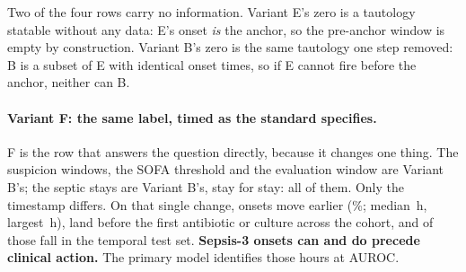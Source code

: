 \begin{table}[H]
    \centering\small
    \caption{Events in the treatment-anchored (pre-treatment) evaluation window.
    E's and B's zeros are entailed by Proposition~\ref{prop:h3}. Variant F holds
    the Sepsis-3 conjunction and the labelled stays fixed and changes only the
    onset timestamp to the standard $\min(t_{\text{susp}}, t_{\text{SOFA}})$;
    Variant D removes the infection anchor altogether.}
    \label{tab:pretreatment_label}
\end{table}

Two of the four rows carry no information. Variant E's zero is a tautology
statable without any data: E's onset \emph{is} the anchor, so the pre-anchor
window is empty by construction. Variant B's zero is the same tautology one step
removed: B is a subset of E with identical onset times, so if E cannot fire
before the anchor, neither can B.

\paragraph{Variant F: the same label, timed as the standard specifies.}
F is the row that answers the question directly, because it changes one thing.
The suspicion windows, the SOFA threshold and the evaluation window are Variant
B's; the septic stays are Variant B's, stay for stay: all \pcFNOnsets{} of
them. Only the timestamp differs. On that single change, \pcFNMovedEarlier{}
onsets move earlier (\pcFPctMovedEarlier\%; median \pcFMedianShiftH\,h, largest
\pcFMaxShiftH\,h), \pcFNBeforeAnchor{} land before the first antibiotic or
culture across the cohort, and \pcPreTreatOnsetsVarF{} of those fall in the
temporal test set. \textbf{Sepsis-3 onsets can and do precede clinical action.}
The primary model identifies those hours at \pcPreTreatAurocPrimaryF{} AUROC.

